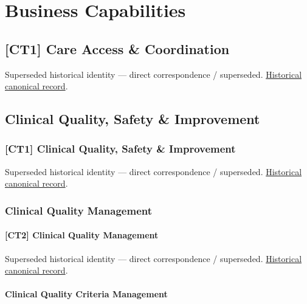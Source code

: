 \section{Business Capabilities}

\subsection{[CT1] Care Access \& Coordination}

\par\label{element:0dec07b6ddbe48bda93a2295dd3e2d7d}
Superseded historical identity — direct correspondence / superseded. \href{../../../../continuum/strategy/capability/0dec07b6ddbe48bda93a2295dd3e2d7d.md}{Historical canonical record}.\par

\subsection{Clinical Quality, Safety \& Improvement}

\subsubsection{[CT1] Clinical Quality, Safety \& Improvement}

\par\label{element:b967c383dbcd4c24abe6a83ea5e79e00}
Superseded historical identity — direct correspondence / superseded. \href{../../../../continuum/strategy/capability/b967c383dbcd4c24abe6a83ea5e79e00.md}{Historical canonical record}.\par

\subsubsection{Clinical Quality Management}

\paragraph{[CT2] Clinical Quality Management}

\par\label{element:dc1bece79eb7452e951d03a2ee6dfaa6}
Superseded historical identity — direct correspondence / superseded. \href{../../../../continuum/strategy/capability/dc1bece79eb7452e951d03a2ee6dfaa6.md}{Historical canonical record}.\par

\paragraph{Clinical Quality Criteria Management}

